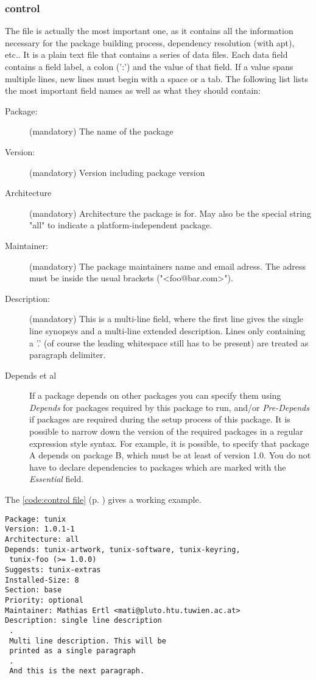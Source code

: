 \subsubsection{control}
\label{control}
The file  is actually the most important one, as it
contains all the information necessary for the package building process,
dependency resolution (with apt), etc.. It is a plain text file that contains a
series of data files. Each data field contains a field label, a colon (':') and
the value of that field. If a value spans multiple lines, new lines must begin
with a space or a tab. The following list lists the most important field names
as well as what they should contain:
\begin{description}
  \item[Package:] (mandatory) The name of the package
  \item[Version:] (mandatory) Version including package version
  \item[Architecture] (mandatory) Architecture the package is for. May also be
    the special string "all" to indicate a platform-independent package.
  \item[Maintainer:] (mandatory) The package maintainers name and email adress.
    The adress must be inside the usual brackets ("<foo@bar.com>").
  \item[Description:] (mandatory) This is a multi-line field, where the first
    line gives the single line synopsys and a multi-line extended description.
    Lines only containing a '.' (of course the leading whitespace still has to
    be present) are treated as paragraph delimiter.
  \item[Depends et al] If a package depends on other packages you can specify
    them using \emph{Depends} for packages required by this package to run,
    and/or \emph{Pre-Depends} if packages are required during the setup process
    of this package. It is possible to narrow down the version of the required
    packages in a regular expression style syntax. For example, it is possible,
    to specify that package A depends on package B, which must be at least of
    version 1.0. You do not have to declare dependencies to packages which are
    marked with the \emph{Essential} field. 
  \end{description}
The \lstlistingname{} \ref{code:control file} (p. \pageref{code:control file})
gives a working example.
\begin{lstlisting}[label=code:control file, caption=Example of a DEBIAN/control
file, float=ht]
Package: tunix
Version: 1.0.1-1
Architecture: all
Depends: tunix-artwork, tunix-software, tunix-keyring,
 tunix-foo (>= 1.0.0)
Suggests: tunix-extras
Installed-Size: 8
Section: base
Priority: optional
Maintainer: Mathias Ertl <mati@pluto.htu.tuwien.ac.at>
Description: single line description
 .
 Multi line description. This will be
 printed as a single paragraph
 .
 And this is the next paragraph.
\end{lstlisting}

